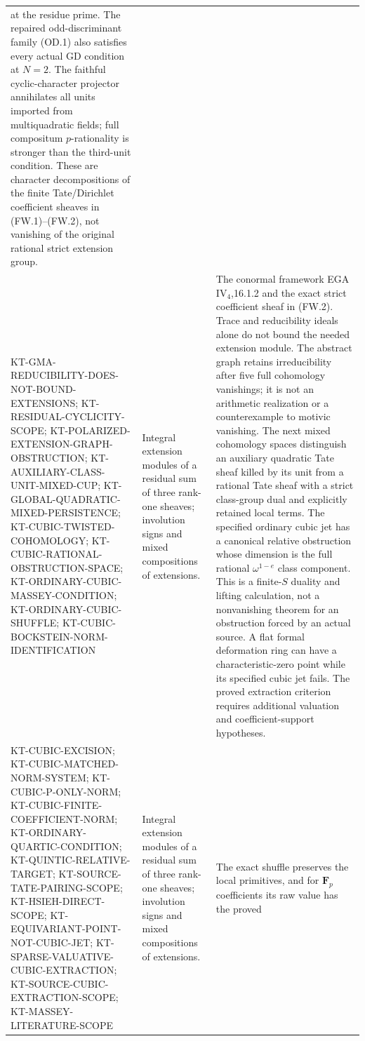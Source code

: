 \documentclass[11pt,a4paper]{article}
\theoremstyle{definition}
\begin{document}
\begin{longtable}{>{\raggedright\arraybackslash}p{}
>{\raggedright\arraybackslash}p{}
>{\raggedright\arraybackslash}p{}}
at the residue prime. The repaired odd-discriminant family
(OD.1) also satisfies every actual GD condition at $N=2$. The faithful cyclic-character projector
annihilates all units imported from multiquadratic fields; full
compositum $p$-rationality is stronger than the third-unit condition.
These are character decompositions of the finite Tate/Dirichlet
coefficient sheaves in (FW.1)--(FW.2), not vanishing of the
original rational strict extension group.\\
KT-GMA-REDUCIBILITY-DOES-NOT-BOUND-EXTENSIONS;
KT-RESIDUAL-CYCLICITY-SCOPE;
KT-POLARIZED-EXTENSION-GRAPH-OBSTRUCTION;
KT-AUXILIARY-CLASS-UNIT-MIXED-CUP;
KT-GLOBAL-QUADRATIC-MIXED-PERSISTENCE;
KT-CUBIC-TWISTED-COHOMOLOGY;
KT-CUBIC-RATIONAL-OBSTRUCTION-SPACE;
KT-ORDINARY-CUBIC-MASSEY-CONDITION;
KT-ORDINARY-CUBIC-SHUFFLE;
KT-CUBIC-BOCKSTEIN-NORM-IDENTIFICATION &
Integral extension modules of a residual sum of three
rank-one sheaves; involution signs and mixed compositions
of extensions. &
The conormal framework EGA IV$_4$,16.1.2 and the exact
strict coefficient sheaf in (FW.2). Trace and reducibility
ideals alone do not bound the needed extension module.
The abstract graph retains irreducibility after five full
cohomology vanishings; it is not an arithmetic realization
or a counterexample to motivic vanishing. The next mixed
cohomology spaces distinguish an auxiliary quadratic Tate
sheaf killed by its unit from a rational Tate sheaf with
a strict class-group dual and explicitly retained local terms.
The specified ordinary cubic jet has a canonical relative
obstruction whose dimension is the full rational
$\omega^{1-e}$ class component. This is a finite-$S$
duality and lifting calculation, not a nonvanishing theorem
for an obstruction forced by an actual source. A flat formal
deformation ring can have a characteristic-zero point while
its specified cubic jet fails. The proved extraction criterion
requires additional valuation and coefficient-support hypotheses.\\
KT-CUBIC-EXCISION; KT-CUBIC-MATCHED-NORM-SYSTEM;
KT-CUBIC-P-ONLY-NORM;
KT-CUBIC-FINITE-COEFFICIENT-NORM;
KT-ORDINARY-QUARTIC-CONDITION; KT-QUINTIC-RELATIVE-TARGET;
KT-SOURCE-TATE-PAIRING-SCOPE;
KT-HSIEH-DIRECT-SCOPE;
KT-EQUIVARIANT-POINT-NOT-CUBIC-JET;
KT-SPARSE-VALUATIVE-CUBIC-EXTRACTION;
KT-SOURCE-CUBIC-EXTRACTION-SCOPE;
KT-MASSEY-LITERATURE-SCOPE &
Integral extension modules of a residual sum of three
rank-one sheaves; involution signs and mixed compositions
of extensions. &
The exact shuffle preserves the local primitives, and for
$\mathbf F_p$ coefficients its raw value has the proved

\end{longtable}
\end{document}
